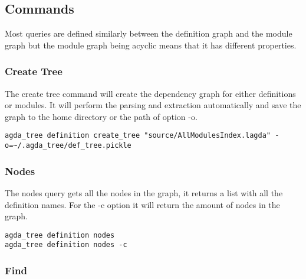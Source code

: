 
\subsection{Commands}

Most queries are defined similarly between the definition graph and the module
graph but the module graph being acyclic means that it has different
properties. 

\subsubsection{Create Tree}

The create tree command will create the dependency graph for either definitions
or modules. It will perform the parsing and extraction automatically and save
the graph to the home directory or the path of option -o.

\begin{lstlisting}
agda_tree definition create_tree "source/AllModulesIndex.lagda" -o=~/.agda_tree/def_tree.pickle
\end{lstlisting}


\subsubsection{Nodes}

The nodes query gets all the nodes in the graph, it returns a list with all the
definition names. For the \textsf{-c} option it will return the amount of nodes
in the graph. 

\begin{lstlisting}
agda_tree definition nodes
agda_tree definition nodes -c
\end{lstlisting}

\subsubsection{Find}

